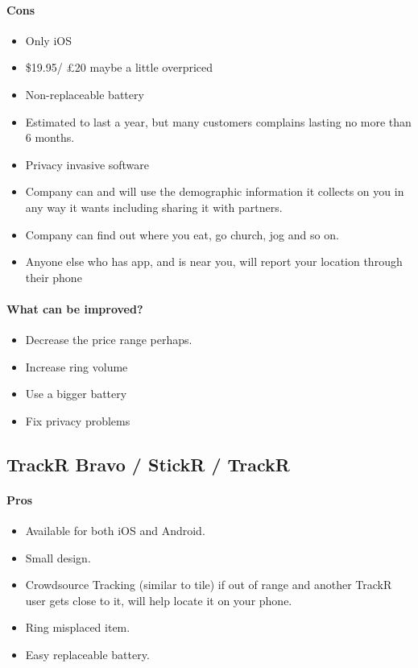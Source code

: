 \documentclass[12pt,a4paper]{article}
\begin{document}
\begin{appendices}
          \paragraph{Cons} 
            \begin{itemize}
              \item Only iOS
              \item \$19.95/ £20 maybe a little overpriced
              \item Non-replaceable battery
              \item Estimated to last a year, but many customers complains lasting no more than 6 months.
              \item Privacy invasive software
              \item Company can and will use the demographic information it collects on you in any way it wants including sharing it with partners.
              \item Company can find out where you eat, go church, jog and so on.
              \item Anyone else who has app, and is near you, will report your location through their phone
            \end{itemize}
          \paragraph{What can be improved?}
            \begin{itemize}
              \item Decrease the price range perhaps.
              \item Increase ring volume
              \item Use a bigger battery
              \item Fix privacy problems
            \end{itemize}
    
        \subsection{TrackR Bravo / StickR / TrackR}
          \paragraph{Pros}
            \begin{itemize}
              \item Available for both iOS and Android.
              \item Small design.
              \item Crowdsource Tracking (similar to tile) if out of range and another TrackR user gets close to it, will help locate it on your phone.
              \item Ring misplaced item.
              \item Easy replaceable battery.
            \end{itemize} 

\end{appendices}
\end{document}
